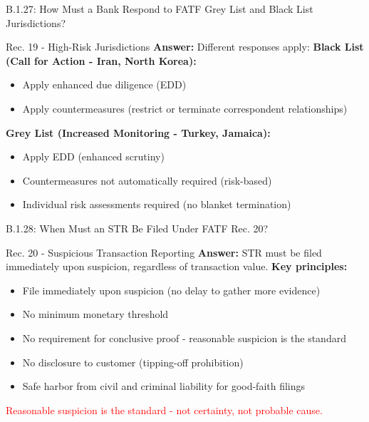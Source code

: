 \documentclass{beamer}
\begin{document}
	\begin{frame}{B.1.27: How Must a Bank Respond to FATF Grey List and Black List Jurisdictions?}
		\begin{block}{Rec. 19 - High-Risk Jurisdictions}
			\textbf{Answer:} Different responses apply:
			\vspace{0.2cm}
			\textbf{Black List (Call for Action - Iran, North Korea):}
			\begin{itemize}
				\item Apply enhanced due diligence (EDD)
				\item Apply countermeasures (restrict or terminate correspondent relationships)
			\end{itemize}
			\textbf{Grey List (Increased Monitoring - Turkey, Jamaica):}
			\begin{itemize}
				\item Apply EDD (enhanced scrutiny)
				\item Countermeasures not automatically required (risk-based)
				\item Individual risk assessments required (no blanket termination)
			\end{itemize}
		\end{block}
	\end{frame}
	
	\begin{frame}{B.1.28: When Must an STR Be Filed Under FATF Rec. 20?}
		\begin{block}{Rec. 20 - Suspicious Transaction Reporting}
			\textbf{Answer:} STR must be filed immediately upon suspicion, regardless of transaction value.
			\vspace{0.2cm}
			\textbf{Key principles:}
			\begin{itemize}
				\item File immediately upon suspicion (no delay to gather more evidence)
				\item No minimum monetary threshold
				\item No requirement for conclusive proof - reasonable suspicion is the standard
				\item No disclosure to customer (tipping-off prohibition)
				\item Safe harbor from civil and criminal liability for good-faith filings
			\end{itemize}
			\textcolor{red}{Reasonable suspicion is the standard - not certainty, not probable cause.}
		\end{block}
	\end{frame}
	
\end{document}
